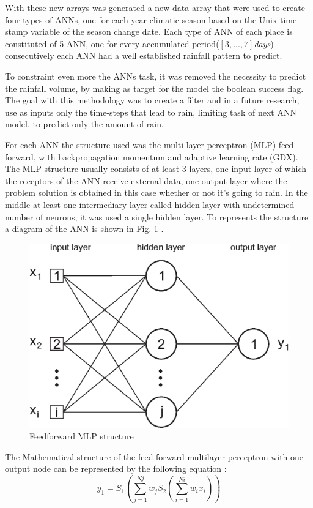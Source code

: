 With these new arrays was generated a new data array that were used to create four types of ANNs, one for each year climatic season based on the Unix time-stamp variable of the season change date.
Each type of ANN of each place is constituted of 5 ANN, one for every accumulated period($[3,...,7]$\textit{days}) consecutively each ANN had a well established rainfall pattern to predict.

To constraint even more the ANNs task, it was removed the necessity to predict the rainfall volume, by making as target for the model the boolean success flag. The goal with this methodology was to create a filter and in a future research, use as inputs only the time-steps that lead to rain,
limiting task of next ANN model, to predict only the amount of rain.

For each ANN the structure used was the multi-layer perceptron (MLP) feed forward, with backpropagation momentum and adaptive learning rate (GDX). The MLP structure usually consists of at least 3 layers, one input layer of which the receptors of the ANN receive external data, one output layer where the problem solution is obtained in this case whether or not it's going to rain. In the middle at least one intermediary layer called hidden layer with undetermined number of neurons, it was used a single hidden layer. To represents the structure a diagram of the ANN is shown in Fig. \ref{img:figure2} .

\begin{figure}[htb!]
 \centering
 \includegraphics[scale=0.75]{capitulo_2/diagram_ann}
 \caption{Feedforward MLP structure}
 \label{img:figure2}
\end{figure}
The Mathematical structure of the feed forward multilayer perceptron with one output node can be represented by the following equation \cite{luk2000study}:
\begin{equation}
 \label{eq:solve16}
 y_1 = S_1(\sum\limits_{j=1}^{Nj} w_j S_2(\sum\limits_{i=1}^{Ni} w_i x_i))
\end{equation}

